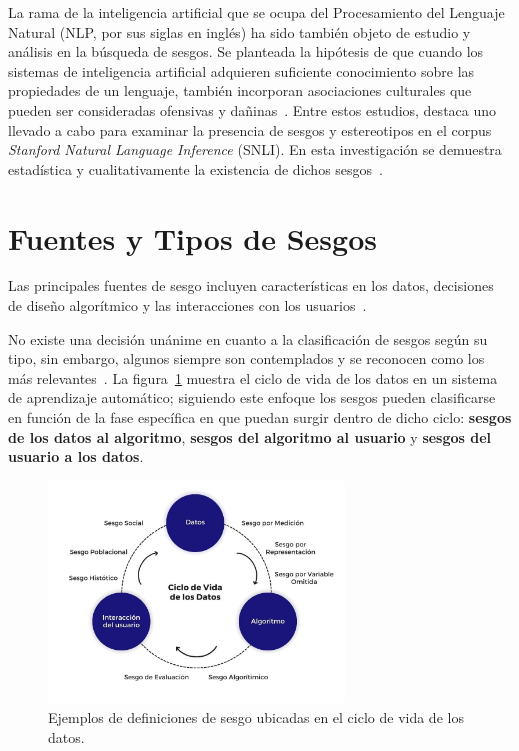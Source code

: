     La rama de la inteligencia artificial que se ocupa del Procesamiento del Lenguaje Natural (NLP, por sus siglas en ingl\'es) ha sido 
    tambi\'en objeto de estudio y an\'alisis en la b\'usqueda de sesgos. Se planteada la hip\'otesis de que cuando los sistemas de inteligencia
    artificial adquieren suficiente conocimiento sobre las propiedades de un lenguaje, tambi\'en incorporan 
    asociaciones culturales que pueden ser consideradas ofensivas y da\~ninas~\parencite{Caliskan_2017}. Entre estos estudios, destaca uno llevado a cabo 
    para examinar la presencia de sesgos y estereotipos en el corpus \emph{Stanford Natural Language Inference} (SNLI). En esta 
    investigaci\'on se demuestra estad\'istica y cualitativamente la existencia de dichos sesgos~\parencite{rudinger-etal-2017-social}.
    
    


\section{Fuentes y Tipos de Sesgos}

    Las principales fuentes de sesgo incluyen caracter\'isticas en los datos, decisiones de dise\~no algor\'itmico y las interacciones 
    con los usuarios~\parencite{resp_data}.
    
    No existe una decisi\'on un\'anime en cuanto a la clasificaci\'on de sesgos seg\'un su tipo, sin embargo, 
    algunos siempre son contemplados y se reconocen como los m\'as relevantes~\parencite{survey}. La figura~\ref{fig:cycle} 
    muestra el ciclo de vida de los datos en un sistema de aprendizaje autom\'atico; siguiendo este enfoque los sesgos pueden 
    clasificarse en funci\'on de la fase espec\'ifica en que puedan surgir dentro de dicho ciclo: 
    \textbf{sesgos de los datos al algoritmo}, \textbf{sesgos del algoritmo al usuario} y \textbf{sesgos del usuario a los datos}.

    \begin{figure}[htpb]
        \begin{center}
            \includegraphics[width=0.7\textwidth]{Graphics/data_cycle.png}
        \end{center}
        \caption{Ejemplos de definiciones de sesgo ubicadas en el ciclo de vida de los datos.}
        \label{fig:cycle}
    \end{figure}
    

